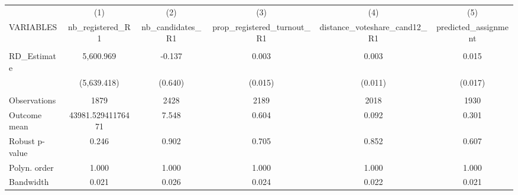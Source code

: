\documentclass[]{article}
\begin{document}
\begin{tabular}{lccccc} \hline
 & (1) & (2) & (3) & (4) & (5) \\
VARIABLES & nb\_registered\_R1 & nb\_candidates\_R1 & prop\_registered\_turnout\_R1 & distance\_voteshare\_cand12\_R1 & predicted\_assignment \\ \hline
 &  &  &  &  &  \\
RD\_Estimate & 5,600.969 & -0.137 & 0.003 & 0.003 & 0.015 \\
 & (5,639.418) & (0.640) & (0.015) & (0.011) & (0.017) \\
 &  &  &  &  &  \\
Observations & 1879 & 2428 & 2189 & 2018 & 1930 \\
Outcome mean & 43981.52941176471 & 7.548 & 0.604 & 0.092 & 0.301 \\
Robust p-value & 0.246 & 0.902 & 0.705 & 0.852 & 0.607 \\
Polyn. order & 1.000 & 1.000 & 1.000 & 1.000 & 1.000 \\
 Bandwidth & 0.021 & 0.026 & 0.024 & 0.022 & 0.021 \\ \hline
\end{tabular}
\end{document}
